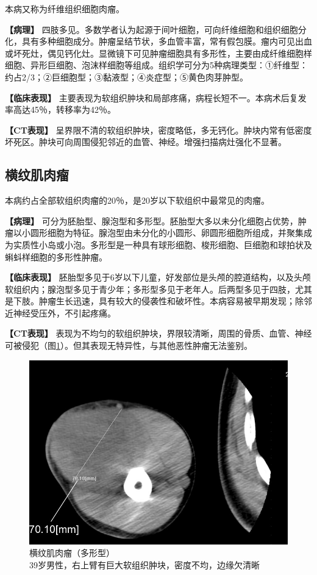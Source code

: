 本病又称为纤维组织细胞肉瘤。

\textbf{【病理】}
四肢多见。多数学者认为起源于间叶细胞，可向纤维细胞和组织细胞分化，具有多种细胞成分。肿瘤呈结节状，多血管丰富，常有假包膜。瘤内可见出血或坏死灶，偶见钙化灶。显微镜下可见肿瘤细胞具有多形性，主要由成纤维细胞样细胞、异形巨细胞、泡沫样细胞等组成。组织学可分为5种病理类型：①纤维型：约占2/3；②巨细胞型；③黏液型；④炎症型；⑤黄色肉芽肿型。

\textbf{【临床表现】}
主要表现为软组织肿块和局部疼痛，病程长短不一。本病术后复发率高达45％，转移率为42％。

\textbf{【CT表现】}
呈界限不清的软组织肿块，密度略低，多无钙化。肿块内常有低密度坏死区。肿块可向周围侵犯邻近的血管、神经。增强扫描病灶强化不显著。

\subsection{横纹肌肉瘤}

本病约占全部软组织肉瘤的20％，是20岁以下软组织中最常见的肉瘤。

\textbf{【病理】}
可分为胚胎型、腺泡型和多形型。胚胎型大多以未分化细胞占优势，肿瘤以小圆形细胞为特征。腺泡型由未分化的小圆形、卵圆形细胞所组成，并聚集成为实质性小岛或小泡。多形型是一种具有球形细胞、梭形细胞、巨细胞和球拍状及蝌蚪样细胞的多形性肿瘤。

\textbf{【临床表现】}
胚胎型多见于6岁以下儿童，好发部位是头颅的腔道结构，以及头颅软组织内；腺泡型多见于青少年；多形型多见于老年人。后两型多见于四肢，尤其是下肢。肿瘤生长迅速，具有较大的侵袭性和破坏性。本病容易被早期发现；除邻近神经受压外，不引起疼痛。

\textbf{【CT表现】}
表现为不均匀的软组织肿块，界限较清晰，周围的骨质、血管、神经可被侵犯（图\ref{fig22-26}）。但其表现无特异性，与其他恶性肿瘤无法鉴别。

\begin{figure}[!htbp]
 \centering
 \includegraphics[width=.7\textwidth,height=\textheight,keepaspectratio]{./images/Image00451.jpg}
 \captionsetup{justification=centering}
 \caption{横纹肌肉瘤（多形型）\\{\small 39岁男性，右上臂有巨大软组织肿块，密度不均，边缘欠清晰}}
 \label{fig22-26}
  \end{figure} 

